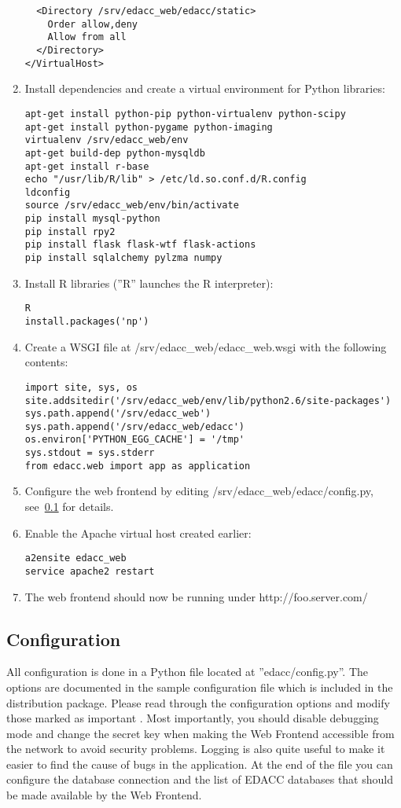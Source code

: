 \begin{enumerate}
{\begin{verbatim}
  <Directory /srv/edacc_web/edacc/static>
    Order allow,deny
    Allow from all
  </Directory>
</VirtualHost>
\end{verbatim}
}
\item{Install dependencies and create a virtual environment for Python libraries:
\begin{verbatim}
apt-get install python-pip python-virtualenv python-scipy
apt-get install python-pygame python-imaging
virtualenv /srv/edacc_web/env
apt-get build-dep python-mysqldb
apt-get install r-base
echo "/usr/lib/R/lib" > /etc/ld.so.conf.d/R.config
ldconfig
source /srv/edacc_web/env/bin/activate
pip install mysql-python
pip install rpy2
pip install flask flask-wtf flask-actions
pip install sqlalchemy pylzma numpy
\end{verbatim}
}
\item{Install R libraries (''R'' launches the R interpreter):
\begin{verbatim}
R
install.packages('np')
\end{verbatim}
}
\item{Create a WSGI file at /srv/edacc\_web/edacc\_web.wsgi with the following contents:
\begin{verbatim}
import site, sys, os
site.addsitedir('/srv/edacc_web/env/lib/python2.6/site-packages')
sys.path.append('/srv/edacc_web')
sys.path.append('/srv/edacc_web/edacc')
os.environ['PYTHON_EGG_CACHE'] = '/tmp'
sys.stdout = sys.stderr
from edacc.web import app as application
\end{verbatim}
}
\item Configure the web frontend by editing /srv/edacc\_web/edacc/config.py, see~\ref{wf:configuration} for details.
\item{Enable the Apache virtual host created earlier:
\begin{verbatim}
a2ensite edacc_web
service apache2 restart
\end{verbatim}
}
\item The web frontend should now be running under http://foo.server.com/
\end{enumerate}

\subsection{Configuration}
\label{wf:configuration}
All configuration is done in a Python file located at ''edacc/config.py''. The options are documented in the sample configuration
file which is included in the distribution package. Please read through the configuration options and modify those marked as important \attention.
Most importantly, you should disable debugging mode and change the secret key when making the Web Frontend
accessible from the network to avoid security problems. Logging is also quite useful to make it easier to find the cause of bugs in the application.
At the end of the file you can configure the database connection and the list of EDACC databases that should be
made available by the Web Frontend.

